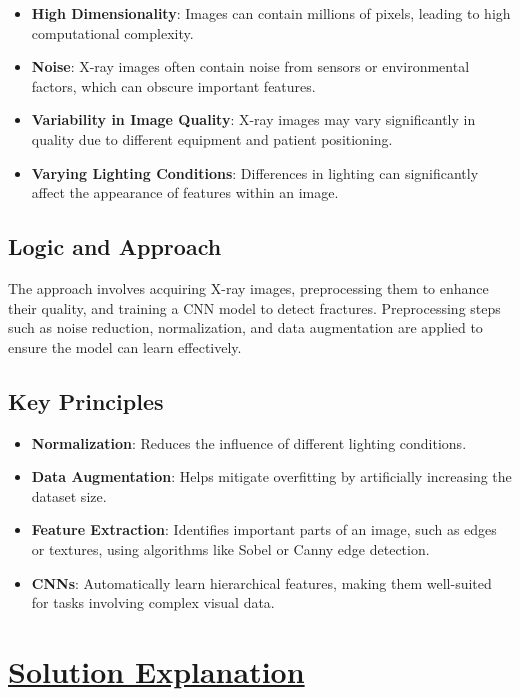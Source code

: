 \documentclass[11pt]{article}
\begin{document}
\begin{itemize}
\item
  \textbf{High Dimensionality}: Images can contain millions of pixels,
  leading to high computational complexity.
\item
  \textbf{Noise}: X-ray images often contain noise from sensors or
  environmental factors, which can obscure important features.
\item
  \textbf{Variability in Image Quality}: X-ray images may vary
  significantly in quality due to different equipment and patient
  positioning.
\item
  \textbf{Varying Lighting Conditions}: Differences in lighting can
  significantly affect the appearance of features within an image.
\end{itemize}

\subsection*{Logic and Approach}\label{logic-and-approach}

The approach involves acquiring X-ray images, preprocessing them to
enhance their quality, and training a CNN model to detect fractures.
Preprocessing steps such as noise reduction, normalization, and data
augmentation are applied to ensure the model can learn effectively.

\subsection*{ Key Principles}\label{key-principles}

\begin{itemize}
\item
  \textbf{Normalization}: Reduces the influence of different lighting
  conditions.
\item
  \textbf{Data Augmentation}: Helps mitigate overfitting by artificially
  increasing the dataset size.
\item
  \textbf{Feature Extraction}: Identifies important parts of an image,
  such as edges or textures, using algorithms like Sobel or Canny edge
  detection.
\item
  \textbf{CNNs}: Automatically learn hierarchical features, making them
  well-suited for tasks involving complex visual data.
\end{itemize}


\section*{\Large\underline{\textbf{Solution Explanation}}}\label{references}
\end{document}
